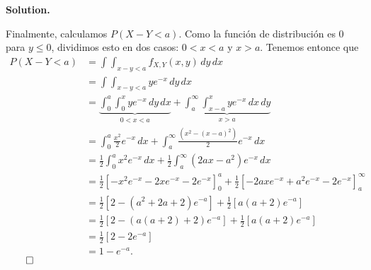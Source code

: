 \documentclass{article}
\theoremstyle{problemstyle}
\newenvironment{solution}{%
  \begin{mdframed}[linewidth=0.8pt,linecolor=Gray,backgroundcolor=Gray!5,roundcorner=5pt]%
  \noindent\textbf{Solution.}%
}{%
\hfill $ \qed $ 
  \end{mdframed}%
}
\begin{document}
\begin{solution}
	Finalmente, calculamos $ P(X-Y<a) $. Como la funci\'on de distribuci\'on es 0
	para $ y\leq 0 $, dividimos esto en dos casos: $ 0<x<a $ y $ x > a $. Tenemos entonce que
	\begin{align*}
		P(X-Y<a) & = \int\int_{x-y<a} f_{X,Y}(x,y)\,dy\,dx                                                     \\
		         & =\int\int_{x-y<a}ye^{-x}\,dy\,dx                                                            \\
             & =\underbrace{\int_{0}^{a}\int_{0}^{x}ye^{-x}\,dy\,dx}_{0<x<a} + \underbrace{\int_{a}^{\infty}\int_{x-a}^{x}ye^{-x}\,dx\,dy}_{x>a}        \\
		         & =\int_{0}^{a}\frac{x^2}{2}e^{-x}\,dx + \int_{a}^{\infty}\frac{(x^{2} - (x-a)^{2})}{2}e^{-x}\,dx \\
		         & =\frac{1}{2}\int_{0}^{a}x^2e^{-x}\,dx + \frac{1}{2}\int_{a}^{\infty}(2ax-a^2)e^{-x}\,dx \\
             &= \frac{1}{2}\left[-x^2e^{-x} - 2xe^{-x} - 2e^{-x}\right]_{0}^{a} + \frac{1}{2}\left[-2axe^{-x} + a^2e^{-x}-2e^{-x}\right]_{a}^{\infty}\\
             &=  \frac{1}{2}\left[2-(a^2+2a+2)e^{-a}\right] + \frac{1}{2}\left[a(a+2)e^{-a}\right]\\
             &=  \frac{1}{2}\left[2-(a(a+2)+2)e^{-a}\right] + \frac{1}{2}\left[a(a+2)e^{-a}\right]\\
             &=  \frac{1}{2}\left[2-2e^{-a}\right]\\
             &= 1-e^{-a}.
	\end{align*}
\end{solution}
\end{document}
